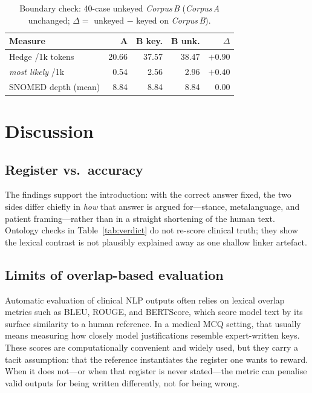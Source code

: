 \documentclass[11pt,a4paper]{article}
\newcommand{\CA}{\emph{Corpus\,A}}
\newcommand{\CB}{\emph{Corpus\,B}}
\begin{document}
\begingroup
\setlength{\tabcolsep}{6pt}
\renewcommand{\arraystretch}{1.1}
\begin{table}[t]
\centering
\small
\caption{Boundary check: 40-case unkeyed \CB{} (\CA{} unchanged; $\Delta =$ unkeyed $-$ keyed on \CB{}).}
\label{tab:ablation}
\begin{tabular}{@{}lrrrr@{}}
\toprule
Measure & A & B key. & B unk. & $\Delta$ \\
\midrule
Hedge /1k tokens & 20.66 & 37.57 & 38.47 & $+0.90$ \\
\emph{most likely} /1k & 0.54 & 2.56 & 2.96 & $+0.40$ \\
SNOMED depth (mean) & 8.84 & 8.84 & 8.84 & 0.00 \\
\bottomrule
\end{tabular}
\end{table}
\endgroup

\section{Discussion}
\label{sec:discussion}

\subsection{Register vs.\ accuracy}

The findings support the introduction: with the correct answer fixed, the two sides differ chiefly in \emph{how} that answer is argued for---stance, metalanguage, and patient framing---rather than in a straight shortening of the human text. Ontology checks in Table~\ref{tab:verdict} do not re-score clinical truth; they show the lexical contrast is not plausibly explained away as one shallow linker artefact.

\subsection{Limits of overlap-based evaluation}

Automatic evaluation of clinical NLP outputs often relies on lexical overlap metrics such as BLEU, ROUGE, and BERTScore, which score model text by its surface similarity to a human reference. In a medical MCQ setting, that usually means measuring how closely model justifications resemble expert-written keys. These scores are computationally convenient and widely used, but they carry a tacit assumption: that the reference instantiates the register one wants to reward. When it does not---or when that register is never stated---the metric can penalise valid outputs for being written differently, not for being wrong.
\end{document}
